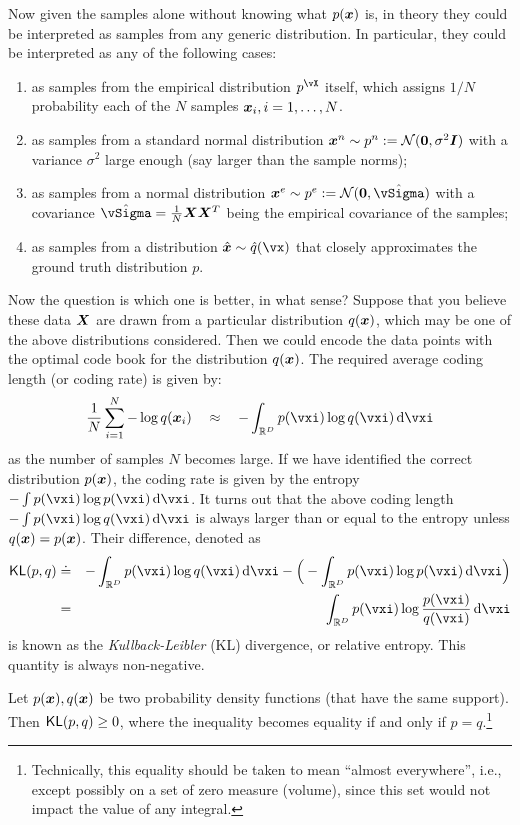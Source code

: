 \documentclass[../../book-main.tex]{subfiles}
\begin{document}
Now given the samples alone without knowing what $p(\bm{x})$ is, in theory they could be interpreted as samples from any generic distribution. In particular, they could be interpreted as any of the following cases:
\begin{enumerate}
	\item as samples from the empirical distribution $p^{\vX}$ itself, which assigns $1/N$ probability each of the $N$ samples $\bm{x}_i, i=1, \ldots, N$.
	\item as samples from a standard normal distribution $\bm{x}^n \sim p^{n} := \mathcal{N}(\boldsymbol{0}, \sigma^2 \boldsymbol{I})$ with a variance $\sigma^2$ large enough (say larger than the sample norms);
	\item as samples from a normal distribution $\x^e \sim p^{e} := \mathcal{N}(\boldsymbol{0}, \hat{\vSigma})$ with a covariance $\hat{\vSigma} = \frac{1}{N} \X \X^T$ being the empirical covariance of the samples;
	\item as samples from a distribution $\hat \x \sim \hat{q}(\vx)$ that closely approximates the ground truth  distribution $p$.
\end{enumerate}
Now the question is which one is better, in what sense? Suppose that you believe these data $\bm{X}$ are drawn from a particular distribution  $q(\bm{x})$, which may be one of the above distributions considered. Then we could encode the data points with the optimal code book for the distribution $q(\bm{x})$. The required average coding length (or coding rate) is given by:
\begin{equation}
	\frac{1}{N}\sum_{i=1}^N -\log q(\x_i) \quad \approx \quad - \int_{\R^{D}} p(\vxi) \log q(\vxi)\odif{\vxi}
\end{equation}
as the number of samples $N$ becomes large. If we have identified the correct distribution $p(\bm{x})$, the coding rate is given by the entropy $- \int p(\vxi) \log p(\vxi) \odif{\vxi}$. It turns out that the above coding length $- \int p(\vxi) \log q(\vxi) \odif{\vxi}$ is always larger than or equal to the entropy unless $q(\bm{x}) = p(\bm{x})$. Their difference, denoted as
\begin{eqnarray}
	\KL(p, q) &\doteq& - \int_{\R^{D}} p(\vxi) \log q(\vxi) \odif{\vxi}  - \Big(- \int_{\R^{D}} p(\vxi) \log p(\vxi) \odif{\vxi} \Big)\\
	&=& \int_{\R^{D}} p(\vxi) \log \frac{p(\vxi)}{q(\vxi)} \odif{\vxi}
\end{eqnarray}
is known as the {\em Kullback-Leibler} (KL) divergence, or relative entropy. This quantity is always non-negative.
\begin{theorem}\label{thm:information-inequality}
	Let $p(\bm{x}), q(\bm{x})$ be two probability density functions (that have the same support). Then $\operatorname{\mathsf{KL}}(p, q) \ge 0$, where the inequality becomes equality if and only if $p = q$.\footnote{Technically, this equality should be taken to mean ``almost everywhere'', i.e., except possibly on a set of zero measure (volume), since this set would not impact the value of any integral.}
\end{theorem}
\end{document}
